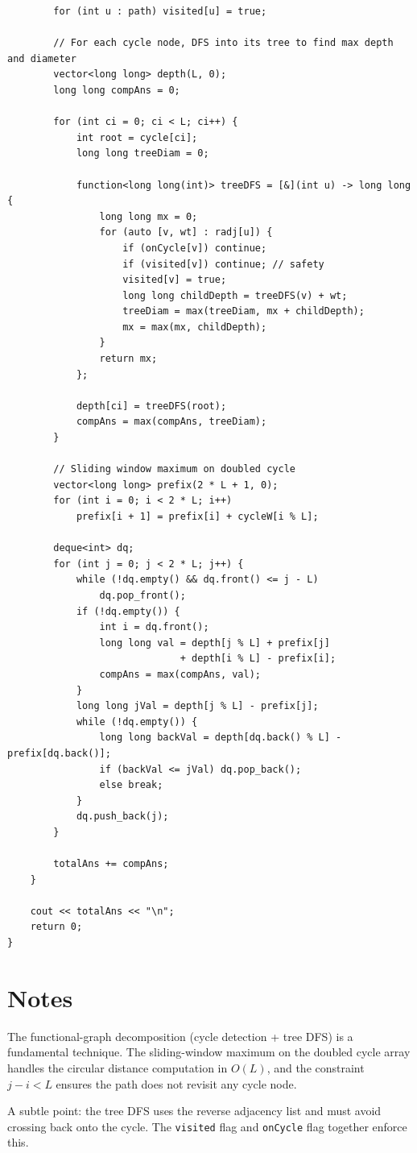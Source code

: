 \documentclass[11pt,a4paper]{article}
\begin{document}
\begin{lstlisting}
        for (int u : path) visited[u] = true;

        // For each cycle node, DFS into its tree to find max depth and diameter
        vector<long long> depth(L, 0);
        long long compAns = 0;

        for (int ci = 0; ci < L; ci++) {
            int root = cycle[ci];
            long long treeDiam = 0;

            function<long long(int)> treeDFS = [&](int u) -> long long {
                long long mx = 0;
                for (auto [v, wt] : radj[u]) {
                    if (onCycle[v]) continue;
                    if (visited[v]) continue; // safety
                    visited[v] = true;
                    long long childDepth = treeDFS(v) + wt;
                    treeDiam = max(treeDiam, mx + childDepth);
                    mx = max(mx, childDepth);
                }
                return mx;
            };

            depth[ci] = treeDFS(root);
            compAns = max(compAns, treeDiam);
        }

        // Sliding window maximum on doubled cycle
        vector<long long> prefix(2 * L + 1, 0);
        for (int i = 0; i < 2 * L; i++)
            prefix[i + 1] = prefix[i] + cycleW[i % L];

        deque<int> dq;
        for (int j = 0; j < 2 * L; j++) {
            while (!dq.empty() && dq.front() <= j - L)
                dq.pop_front();
            if (!dq.empty()) {
                int i = dq.front();
                long long val = depth[j % L] + prefix[j]
                              + depth[i % L] - prefix[i];
                compAns = max(compAns, val);
            }
            long long jVal = depth[j % L] - prefix[j];
            while (!dq.empty()) {
                long long backVal = depth[dq.back() % L] - prefix[dq.back()];
                if (backVal <= jVal) dq.pop_back();
                else break;
            }
            dq.push_back(j);
        }

        totalAns += compAns;
    }

    cout << totalAns << "\n";
    return 0;
}
\end{lstlisting}

\section{Notes}
The functional-graph decomposition (cycle detection + tree DFS) is a fundamental technique. The sliding-window maximum on the doubled cycle array handles the circular distance computation in $O(L)$, and the constraint $j - i < L$ ensures the path does not revisit any cycle node.

A subtle point: the tree DFS uses the reverse adjacency list and must avoid crossing back onto the cycle. The \texttt{visited} flag and \texttt{onCycle} flag together enforce this.
\end{document}

